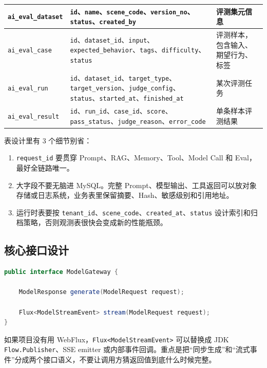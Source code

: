 \documentclass[9pt,a4paper,twocolumn]{ctexart}
\begin{document}
{\begin{tabular}{|p{}|p{}|p{}|}
\hline
\texttt{ai\_eval\_dataset} & \texttt{id}、\texttt{name}、\texttt{scene\_code}、\texttt{version\_no}、\texttt{status}、\texttt{created\_by} & 评测集元信息 \\
\hline
\texttt{ai\_eval\_case} & \texttt{id}、\texttt{dataset\_id}、\texttt{input}、\texttt{expected\_behavior}、\texttt{tags}、\texttt{difficulty}、\texttt{status} & 评测样本，包含输入、期望行为、标签 \\
\hline
\texttt{ai\_eval\_run} & \texttt{id}、\texttt{dataset\_id}、\texttt{target\_type}、\texttt{target\_version}、\texttt{judge\_config}、\texttt{status}、\texttt{started\_at}、\texttt{finished\_at} & 某次评测任务 \\
\hline
\texttt{ai\_eval\_result} & \texttt{id}、\texttt{run\_id}、\texttt{case\_id}、\texttt{score}、\texttt{pass\_status}、\texttt{judge\_reason}、\texttt{error\_code} & 单条样本评测结果 \\
\hline
\end{tabular}
}



表设计里有 3 个细节别省：


\begin{enumerate}[itemsep=1pt, topsep=2pt]
  \item \texttt{request\_id} 要贯穿 Prompt、RAG、Memory、Tool、Model Call 和 Eval，最好全链路唯一。
  \item 大字段不要无脑进 MySQL。完整 Prompt、模型输出、工具返回可以放对象存储或日志系统，业务表里保留摘要、Hash、敏感级别和引用地址。
  \item 运行时表要按 \texttt{tenant\_id}、\texttt{scene\_code}、\texttt{created\_at}、\texttt{status} 设计索引和归档策略，否则观测表很快会变成新的性能瓶颈。
\end{enumerate}


\subsection*{核心接口设计}


\begin{lstlisting}[language=Java]
public interface ModelGateway {

    ModelResponse generate(ModelRequest request);

    Flux<ModelStreamEvent> stream(ModelRequest request);
}
\end{lstlisting}



如果项目没有用 WebFlux，\texttt{Flux<ModelStreamEvent>} 可以替换成 JDK \texttt{Flow.Publisher}、SSE emitter 或内部事件回调。重点是把“同步生成”和“流式事件”分成两个接口语义，不要让调用方猜返回值到底什么时候完整。
\end{document}
